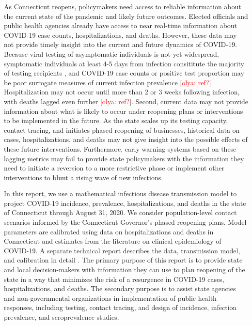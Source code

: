 \documentclass[11pt]{article}
\newcommand{\comment}[1]{[\textcolor{red}{#1}]}
\begin{document}

As Connecticut reopens, policymakers need access to reliable information about the current state of the pandemic and likely future outcomes.  Elected officials and public health agencies already have access to near real-time information about COVID-19 case counts, hospitalizations, and deaths.  However, these data may not provide timely insight into the current and future dynamics of COVID-19.  Because viral testing of asymptomatic individuals is not yet widespread, symptomatic individuals at least 4-5 days from infection consititute the majority of testing recipients \citep{lauer2020incubation, bi2020epidemiology, li2020early, linton2020incubation, he2020estimation, salje2020estimating, wei2020presymptomatic}, and COVID-19 case counts or positive test proportion may be poor surrogate measures of current infection prevalence \comment{olya: ref?}.   Hospitalization may not occur until more than 2 or 3 weeks following infection, with deaths lagged even further \comment{olya: ref?}.  Second, current data may not provide information about what is likely to occur under reopening plans or interventions to be implemented in the future. As the state scales up its testing capacity, contact tracing, and initiates phased reopening of businesses, historical data on cases, hospitalizations, and deaths may not give insight into the possible effects of these future interventions.  Furthermore, early warning systems based on these lagging metrics may fail to provide state policymakers with the information they need to initiate a reversion to a more restrictive phase or implement other interventions to blunt a rising wave of new infections. 


In this report, we use a mathematical infectious disease transmission model to project COVID-19 incidence, prevalence, hospitalizations, and deaths in the state of Connecticut through August 31, 2020.  We consider population-level contact scenarios informed by the Connecticut Governor's phased reopening plans.  Model parameters are calibrated using data on hospitalizations and deaths in Connecticut and estimates from the literature on clinical epidemiology of COVID-19.  A separate technical report describes the data, transmission model, and calibration in detail \citep{morozova2020tech}.  The primary purpose of this report is to provide state and local decision-makers with information they can use to plan reopening of the state in a way that minimizes the risk of a resurgence in COVID-19 cases, hospitalizations, and deaths.  The secondary purpose is to assist state agencies and non-governmental organizations in implementation of public health responses, including testing, contact tracing, and design of incidence, infection prevalence, and seroprevalence studies. 
\end{document}
